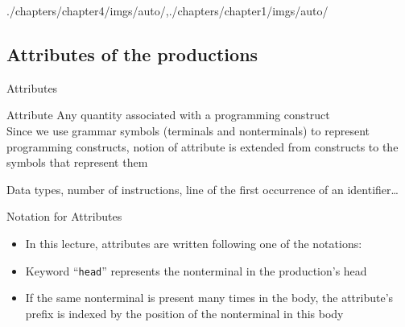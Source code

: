 \begin{graphicspathcontext}{{./chapters/chapter4/imgs/auto/},{./chapters/chapter1/imgs/auto/}}
\begin{bibunit}[apalike]
\subsection{Attributes of the productions}
\subsectiontableofcontentslide

\begin{frame}{Attributes}
	\begin{definitionblock}{Attribute}
		Any quantity associated with a programming construct \\[.5cm]
		Since we use grammar symbols (terminals and nonterminals) to represent programming constructs, notion of attribute is extended from constructs to the symbols that represent them
	\end{definitionblock}
	\vspace{.5cm}
	\begin{examples}
		Data types, number of instructions, line of the first occurrence of an identifier\dots
	\end{examples}
\end{frame}

\begin{frame}{Notation for Attributes}
	\begin{itemize}
		\item In this lecture, attributes are written following one of the notations: \\[.25cm]
		\item Keyword ``\texttt{head}'' represents the nonterminal in the production's head
		\item If the same nonterminal is present many times in the body, the attribute's prefix is indexed by the position of the nonterminal in this body
	\end{itemize}
	\vspace{.5cm}
	\begin{sdd}
		\sdddots
	\end{sdd}
\end{frame}


\end{bibunit}
\end{graphicspathcontext}
